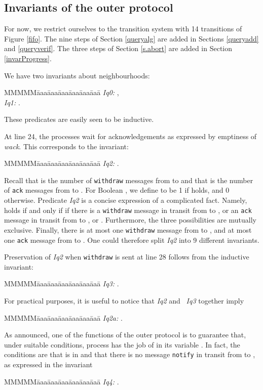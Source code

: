 \documentclass[10pt]{article} \usepackage[english]{babel}
\newenvironment{tab}{\begin{tabbing}
MMMMM\=aaa\=aaa\=aaa\=aaa\=aaa\=aaa\= \kill}{\end{tabbing}}
\def\S #1/{\mbox {\textsl{#1}}}
\def\T #1/{\mbox {\texttt{#1}}}
\begin{document}
\subsection {Invariants of the outer protocol}
\label{InvOuter} 

For now, we restrict ourselves to the transition system with 14
transitions of Figure \ref{fifo}.  The nine steps of Section
\ref{queryalg} are added in Sections \ref{queryadd} and
\ref{queryverif}.  The three steps of Section \ref{s.abort} are added
in Section \ref{invarProgress}.

We have two invariants about neighbourhoods:
\begin{tab}
\S Iq0:/ \>  ,\\
\S Iq1:/ \>  . 
\end{tab}
These predicates are easily seen to be inductive.

At line 24, the processes wait for acknowledgements as expressed by
emptiness of \S wack/. This corresponds to the invariant:
\begin{tab}
\S Iq2:/ \>  .
\end{tab}
Recall that  is the number of \T withdraw/ messages
from  to  and that  is the number of \T ack/
messages from  to .  For Boolean , we define 
to be 1 if  holds, and 0 otherwise.  Predicate \S Iq2/ is a concise
expression of a complicated fact.  Namely,  holds if
and only if if there is a \T withdraw/ message in transit from  to
, or an \T ack/ message in transit from  to , or .  Furthermore, the three possibilities are mutually
exclusive. Finally, there is at most one \T withdraw/ message from 
to , and at most one \T ack/ message from  to .  One could
therefore split \S Iq2/ into 9 different invariants.

Preservation of \S Iq2/ when \T withdraw/ is sent at line 28 follows
from the inductive invariant:
\begin{tab}
\S Iq3:/ \>  .
\end{tab}

For practical purposes, it is useful to notice that \S Iq2/ and \S
Iq3/ together imply
\begin{tab}
\S Iq2a:/ \>  .
\end{tab}

As announced, one of the functions of the outer protocol is to
guarantee that, under suitable conditions, process  has the job of
 in its variable .  In fact, the conditions are that
 is in  and that there is no message \T notify/ in
transit from  to , as expressed in the invariant
\begin{tab}
\S Iq4:/ \>  .
\end{tab}
\end{document}
